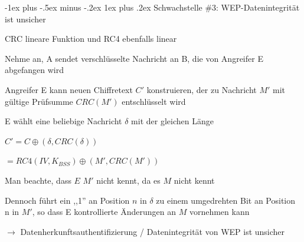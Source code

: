 \documentclass[a4paper]{article}
\makeatletter
\renewcommand{\subsubsection}{\@startsection{subsubsection}{3}{0mm}%
 {-1ex plus -.5ex minus -.2ex}%
 {1ex plus .2ex}%
 {\normalfont\small\bfseries}}
\makeatother
\begin{document}
\begin{multicols}{3}
      \subsubsection{Schwachstelle \#3: WEP-Datenintegrität ist unsicher}
      \begin{itemize*}
            \item CRC lineare Funktion und RC4 ebenfalls linear
            \item Nehme an, A sendet verschlüsselte Nachricht an B, die von Angreifer E abgefangen wird
            \item Angreifer E kann neuen Chiffretext $C'$ konstruieren, der zu Nachricht $M'$ mit gültige Prüfsumme $CRC(M')$ entschlüsselt wird
            \item E wählt eine beliebige Nachricht $\delta$ mit der gleichen Länge
            \item $C' = C \oplus (\delta, CRC(\delta))$%
            \item $= RC4(IV, K_{BSS}) \oplus (M', CRC(M'))$
            \item Man beachte, dass $E$ $M'$ nicht kennt, da es $M$ nicht kennt
            \item Dennoch führt ein ,,1'' an Position $n$ in $\delta$ zu einem umgedrehten Bit an Position n in $M'$, so dass E kontrollierte Änderungen an $M$ vornehmen kann
            \item[$\rightarrow$] Datenherkunftsauthentifizierung / Datenintegrität von WEP ist unsicher
      \end{itemize*}


\end{multicols}
\end{document}
